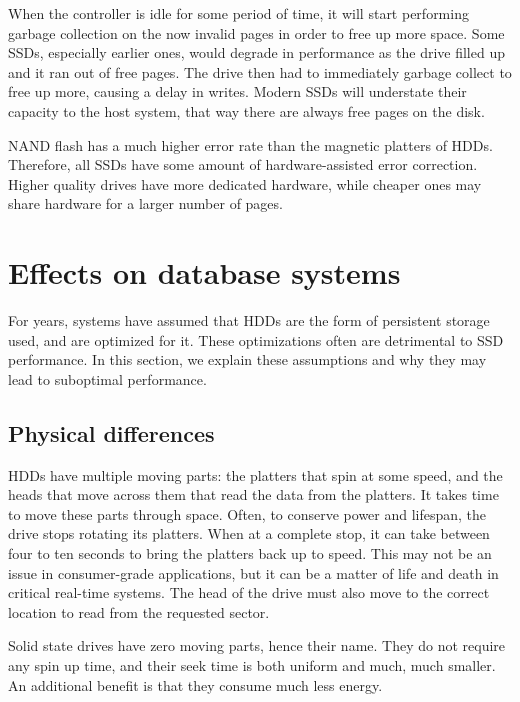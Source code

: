 \documentclass[format=acmsmall, review=false, screen=true]{acmart}
\begin{document}
When the controller is idle for some period of time, it will start performing garbage collection on the now invalid pages 
in order to free up more space. Some SSDs, especially earlier ones, would degrade in performance as the drive filled up 
and it ran out of free pages. The drive then had to immediately garbage collect to free up more, causing a delay in writes. 
Modern SSDs will understate their capacity to the host system, that way there are always free pages on the disk. 
\cite{Cornwell2012, Micheloni2013, MatejFucek2014}

NAND flash has a much higher error rate than the magnetic platters of HDDs. Therefore, all SSDs have some amount of 
hardware-assisted error correction. Higher quality drives have more dedicated hardware, while cheaper ones may share 
hardware for a larger number of pages. \cite{Cornwell2012, Micheloni2013, MatejFucek2014}

\section{Effects on database systems}

For years, systems have assumed that HDDs are the form of persistent storage used, and are optimized for it. These 
optimizations often are detrimental to SSD performance. In this section, we explain these assumptions and why they 
may lead to suboptimal performance.

\subsection{Physical differences}

HDDs have multiple moving parts: the platters that spin at some speed, and the heads that move across them that read the 
data from the platters. It takes time to move these parts through space. Often, to conserve power and lifespan, the drive 
stops rotating its platters. When at a complete stop, it can take between four to ten seconds to bring the platters back 
up to speed. This may not be an issue in consumer-grade applications, but it can be a matter of life and death in critical
real-time systems. \cite{MatejFucek2014} The head of the drive must also move to the correct location to read from the 
requested sector. \cite{Cornwell2012}

Solid state drives have zero moving parts, hence their name. They do not require any spin up time, and their seek time is 
both uniform and much, much smaller. An additional benefit is that they consume much less energy. 
\cite{Cornwell2012, Micheloni2013, MatejFucek2014}
\end{document}
